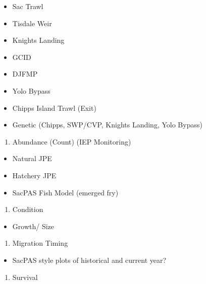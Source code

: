 \documentclass[
]{book}
\providecommand{\tightlist}{%
  \setlength{\itemsep}{0pt}\setlength{\parskip}{0pt}}
\theoremstyle{definition}
\theoremstyle{definition}
\theoremstyle{definition}
\theoremstyle{definition}
\theoremstyle{remark}
\begin{document}
\begin{itemize}
\tightlist
\item
  Sac Trawl
\item
  Tisdale Weir
\item
  Knights Landing
\item
  GCID
\item
  DJFMP
\item
  Yolo Bypass
\item
  Chipps Island Trawl (Exit)
\item
  Genetic (Chipps, SWP/CVP, Knights Landing, Yolo Bypass)
\end{itemize}

\begin{enumerate}
\def\labelenumi{\arabic{enumi}.}
\tightlist
\item
  Abundance (Count) (IEP Monitoring)
\end{enumerate}

\begin{itemize}
\tightlist
\item
  Natural JPE
\item
  Hatchery JPE
\item
  SacPAS Fish Model (emerged fry)
\end{itemize}

\begin{enumerate}
\def\labelenumi{\arabic{enumi}.}
\setcounter{enumi}{1}
\tightlist
\item
  Condition
\end{enumerate}

\begin{itemize}
\tightlist
\item
  Growth/ Size
\end{itemize}

\begin{enumerate}
\def\labelenumi{\arabic{enumi}.}
\setcounter{enumi}{2}
\tightlist
\item
  Migration Timing
\end{enumerate}

\begin{itemize}
\tightlist
\item
  SacPAS style plots of historical and current year?
\end{itemize}

\begin{enumerate}
\def\labelenumi{\arabic{enumi}.}
\setcounter{enumi}{3}
\tightlist
\item
  Survival
\end{enumerate}
\end{document}
